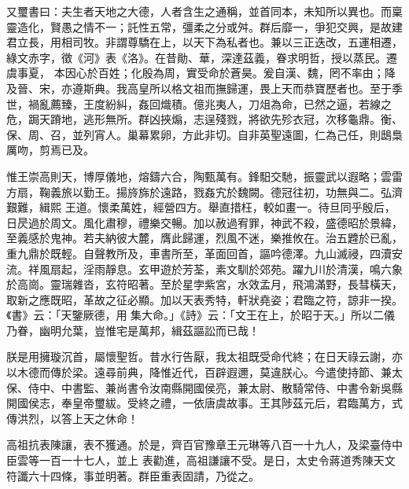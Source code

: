 \begin{pinyinscope}
 又璽書曰：夫生者天地之大德，人者含生之通稱，並首同本，未知所以異也。而稟靈造化，賢愚之情不一；託性五常，彊柔之分或舛。群后靡一，爭犯交興，是故建君立長，用相司牧。非謂尊驕在上，以天下為私者也。兼以三正迭改，五運相遷，綠文赤字，徵《河》表《洛》。在昔勛、華，深達茲義，眷求明哲，授以蒸民。遷虞事夏，
 本因心於百姓；化殷為周，實受命於蒼昊。爰自漢、魏，罔不率由；降及晉、宋，亦遵斯典。我高皇所以格文祖而撫歸運，畏上天而恭寶歷者也。至于季世，禍亂薦臻，王度紛糾，姦回熾積。億兆夷人，刀俎為命，已然之逼，若線之危，跼天蹐地，逃形無所。群凶挾煽，志逞殘戮，將欲先殄衣冠，次移龜鼎。衡、保、周、召，並列宵人。巢幕累卵，方此非切。自非英聖遠圖，仁為己任，則鴟梟厲吻，剪焉已及。



 惟王崇高則天，博厚儀地，熔鑄六合，陶甄萬有。鋒馹交馳，振靈武以遐略；雲雷方扇，鞠義旅以勤王。揚旍旆於遠路，戮姦宄於魏闕。德冠往初，功無與二。弘濟艱難，緝熙
 王道。懷柔萬姓，經營四方。舉直措枉，較如畫一。待旦同乎殷后，日昃過於周文。風化肅穆，禮樂交暢。加以赦過宥罪，神武不殺，盛德昭於景緯，至義感於鬼神。若夫納彼大麓，膺此歸運，烈風不迷，樂推攸在。治五韙於已亂，重九鼎於既輕。自聲教所及，車書所至，革面回首，謳吟德澤。九山滅祲，四瀆安流。祥風扇起，淫雨靜息。玄甲遊於芳荃，素文馴於郊苑。躍九川於清漢，鳴六象於高崗。靈瑞雜沓，玄符昭著。至於星孛紫宮，水效孟月，飛鴻滿野，長彗橫天，取新之應既昭，革故之征必顯。加以天表秀特，軒狀堯姿；君臨之符，諒非一揆。《書》云：「天鑒厥德，用
 集大命。」《詩》云：「文王在上，於昭于天。」所以二儀乃眷，幽明允葉，豈惟宅是萬邦，緝茲謳訟而已哉！



 朕是用擁璇沉首，屬懷聖哲。昔水行告厭，我太祖既受命代終；在日天祿云謝，亦以木德而傳於梁。遠尋前典，降惟近代，百辟遐邇，莫違朕心。今遣使持節、兼太保、侍中、中書監、兼尚書令汝南縣開國侯亮，兼太尉、散騎常侍、中書令新吳縣開國侯志，奉皇帝璽紱。受終之禮，一依唐虞故事。王其陟茲元后，君臨萬方，式傳洪烈，以答上天之休命！



 高祖抗表陳讓，表不獲通。於是，齊百官豫章王元琳等八百一十九人，及梁臺侍中臣雲等一百一十七人，並上
 表勸進，高祖謙讓不受。是日，太史令蔣道秀陳天文符讖六十四條，事並明著。群臣重表固請，乃從之。



\end{pinyinscope}